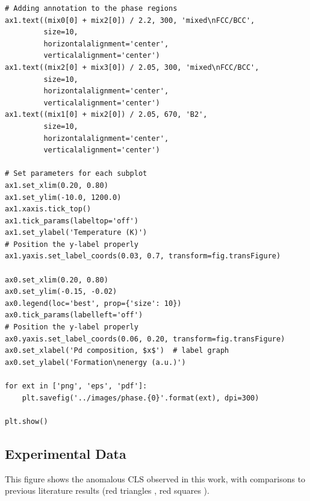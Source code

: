 \documentclass[number, sort&compress, review, 12pt]{elsarticle}
\begin{document}
\begin{verbatim}
# Adding annotation to the phase regions
ax1.text((mix0[0] + mix2[0]) / 2.2, 300, 'mixed\nFCC/BCC',
         size=10,
         horizontalalignment='center',
         verticalalignment='center')
ax1.text((mix2[0] + mix3[0]) / 2.05, 300, 'mixed\nFCC/BCC',
         size=10,
         horizontalalignment='center',
         verticalalignment='center')
ax1.text((mix1[0] + mix2[0]) / 2.05, 670, 'B2',
         size=10,
         horizontalalignment='center',
         verticalalignment='center')

# Set parameters for each subplot
ax1.set_xlim(0.20, 0.80)
ax1.set_ylim(-10.0, 1200.0)
ax1.xaxis.tick_top()
ax1.tick_params(labeltop='off')
ax1.set_ylabel('Temperature (K)')
# Position the y-label properly
ax1.yaxis.set_label_coords(0.03, 0.7, transform=fig.transFigure)

ax0.set_xlim(0.20, 0.80)
ax0.set_ylim(-0.15, -0.02)
ax0.legend(loc='best', prop={'size': 10})
ax0.tick_params(labelleft='off')
# Position the y-label properly
ax0.yaxis.set_label_coords(0.06, 0.20, transform=fig.transFigure)
ax0.set_xlabel('Pd composition, $x$')  # label graph
ax0.set_ylabel('Formation\nenergy (a.u.)')

for ext in ['png', 'eps', 'pdf']:
    plt.savefig('../images/phase.{0}'.format(ext), dpi=300)

plt.show()
\end{verbatim}

\subsection{Experimental Data}
\label{sec-10-2}
This figure shows the anomalous CLS observed in this work, with comparisons to previous literature results (red triangles \cite{martensson-1981-elect-cu}, red squares \cite{cole-1997-deter-charg}).
\end{document}
